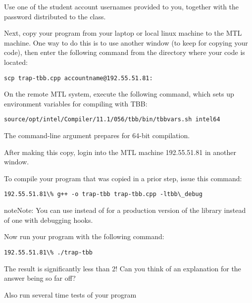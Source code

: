 \documentclass[letterpaper,10pt,openany,oneside]{sphinxmanual}
\begin{document}
Use one of the student account usernames provided to you, together with the password distributed to the class.

Next, copy your program from your laptop or local linux machine to the MTL machine. One way to do this is to use another window (to keep for copying your code), then enter the following command from the directory where your code is located:

\begin{Verbatim}[commandchars=\\\{\}]
scp trap-tbb.cpp accountname@192.55.51.81:
\end{Verbatim}

On the remote MTL system, execute the following command, which sets up environment variables for compiling with TBB:

\begin{Verbatim}[commandchars=\\\{\}]
source/opt/intel/Compiler/11.1/056/tbb/bin/tbbvars.sh intel64
\end{Verbatim}

The  command-line argument prepares for 64-bit compilation.

After making this copy, login into the MTL machine 192.55.51.81 in another window.

To compile your program that was copied in a prior step, issue this command:

\begin{Verbatim}[commandchars=\\\{\}]
192.55.51.81\% g++ -o trap-tbb trap-tbb.cpp -ltbb\_debug
\end{Verbatim}

\begin{notice}{note}{Note:}
You can use  instead of  for a production version of the library instead of one with debugging hooks.
\end{notice}

Now run your program with the following command:

\begin{Verbatim}[commandchars=\\\{\}]
192.55.51.81\% ./trap-tbb
\end{Verbatim}

The result is significantly less than 2! Can you think of an explanation for the answer being so far off?

Also run several time tests of your program
\end{document}
